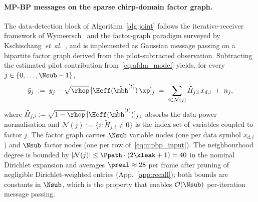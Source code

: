 
\paragraph{MP-BP messages on the sparse chirp-domain factor graph.}
The data-detection block of Algorithm~\ref{alg:joint} follows the iterative-receiver framework of Wymeersch~\cite{wymeersch2007iterativereceiver} and the factor-graph paradigm surveyed by Kschischang~\emph{et~al.}~\cite{kschischang2001factorgraph}, and is implemented as Gaussian message passing on a bipartite factor graph derived from the pilot-subtracted observation. Subtracting the estimated pilot contribution from~\eqref{eq:afdm_model} yields, for every $j \in \{0, \dots, \Nsub - 1\}$,
\begin{equation}
\tilde{y}_j \;:=\; y_j - \sqrt{\rhop}\, [\Heff(\hat{\mbh}^{(t)})\, \xp]_j \;=\; \sum_{i \in \mathcal{N}(j)} \tilde{H}_{j,i}\, x_{d,i} \;+\; n_j, \label{eq:mpbp_input}
\end{equation}
where $\tilde{H}_{j,i} := \sqrt{1-\rhop}\, [\Heff(\hat{\mbh}^{(t)})]_{j,i}$ absorbs the data-power normalisation and $\mathcal{N}(j) := \{i : \tilde{H}_{j,i} \neq 0\}$ is the index set of variables coupled to factor $j$. The factor graph carries $\Nsub$ variable nodes (one per data symbol $x_{d,i}$) and $\Nsub$ factor nodes (one per row of~\eqref{eq:mpbp_input}). The neighbourhood degree is bounded by $|\mathcal{N}(j)| \leq \Ppath \cdot (2\kleak + 1) = 40$ in the nominal Dirichlet expansion and averages $\preal \approx 28$ per frame after pruning of negligible Dirichlet-weighted entries (App.~\ref{app:recall}); both bounds are constants in $\Nsub$, which is the property that enables $\mathcal{O}(\Nsub)$ per-iteration message passing.


